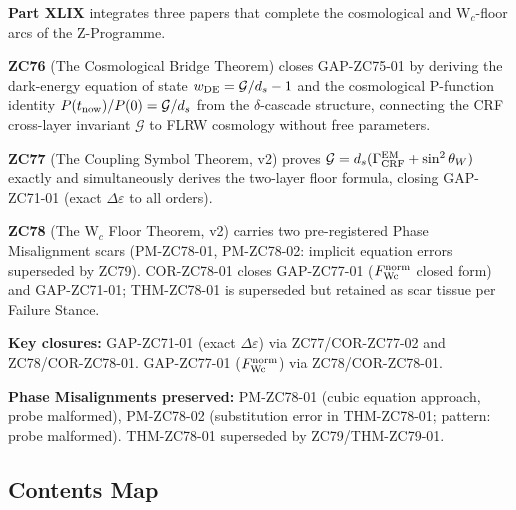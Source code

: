 \documentclass[12pt, a4paper]{article}
\begin{document}
\begin{volumebox}[title={Part XLIX --- ZC76--78: Cosmological Bridge,
  Coupling Symbol, and W$_c$ Floor (v17.13)}]
\sloppy
\textbf{Part XLIX} integrates three papers that complete the
cosmological and W$_c$-floor arcs of the Z-Programme.

\textbf{ZC76} (The Cosmological Bridge Theorem) closes
GAP-ZC75-01 by deriving the dark-energy equation of state
$w_{\rm DE} = \mathcal{G}/d_s - 1$ and the cosmological
P-function identity
$P(t_{\rm now})/P(0) = \mathcal{G}/d_s$ from the
$\delta$-cascade structure, connecting the CRF
cross-layer invariant $\mathcal{G}$ to FLRW cosmology
without free parameters.

\textbf{ZC77} (The Coupling Symbol Theorem, v2) proves
$\mathcal{G} = d_s(\Gamma_{\rm CRF}^{\rm EM} + \sin^2\theta_W)$
exactly and simultaneously derives the two-layer floor formula,
closing GAP-ZC71-01 (exact $\Delta\varepsilon$ to all orders).

\textbf{ZC78} (The W$_c$ Floor Theorem, v2) carries two
pre-registered Phase Misalignment scars (PM-ZC78-01,
PM-ZC78-02: implicit equation errors superseded by ZC79).
COR-ZC78-01 closes GAP-ZC77-01 ($F_{\rm Wc}^{\rm norm}$ closed
form) and GAP-ZC71-01; THM-ZC78-01 is superseded but retained
as scar tissue per Failure Stance.

\textbf{Key closures:}
GAP-ZC71-01 (exact $\Delta\varepsilon$) via ZC77/COR-ZC77-02 and
ZC78/COR-ZC78-01.
GAP-ZC77-01 ($F_{\rm Wc}^{\rm norm}$) via ZC78/COR-ZC78-01.

\textbf{Phase Misalignments preserved:}
PM-ZC78-01 (cubic equation approach, probe malformed),
PM-ZC78-02 (substitution error in THM-ZC78-01; pattern: probe
malformed). THM-ZC78-01 superseded by ZC79/THM-ZC79-01.
\end{volumebox}

\subsection*{Contents Map}
\end{document}
